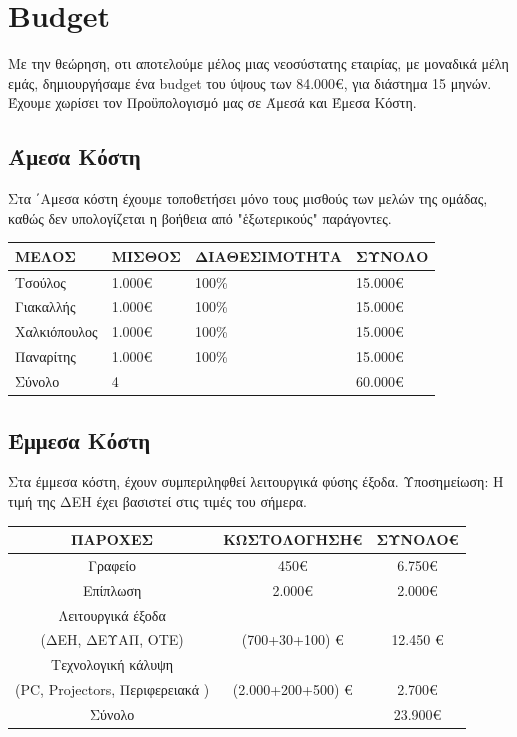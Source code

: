 \documentclass[11pt]{scrartcl} %
\begin{document}
\section{Budget}
Με την θεώρηση, οτι αποτελούμε μέλος μιας νεοσύστατης εταιρίας, με μοναδικά μέλη εμάς,
δημιουργήσαμε ένα budget του ύψους των 84.000€, για διάστημα 15 μηνών. Έχουμε χωρίσει τον Προϋπολογισμό μας σε Άμεσά και Έμεσα Κόστη.
\pagebreak

\subsection{Άμεσα Κόστη}
Στα ΄Αμεσα κόστη έχουμε τοποθετήσει μόνο τους μισθούς των μελών της ομάδας, καθώς δεν υπολογίζεται η βοήθεια από "ἑξωτερικούς" παράγοντες.

\begin{table}[!ht]
    \centering
    \begin{tabular}{|l|l|l|l|}
    \hline
        \textbf{ΜΕΛΟΣ} & \textbf{ΜΙΣΘΟΣ} & \textbf{ΔΙΑΘΕΣΙΜΟΤΗΤΑ} & \textbf{ΣΥΝΟΛΟ} \\ \hline
        Τσούλος & 1.000€ & 100\% & 15.000€ \\ \hline
        Γιακαλλής & 1.000€ & 100\% & 15.000€ \\ \hline
        Χαλκιόπουλος & 1.000€ & 100\% & 15.000€ \\ \hline
        Παναρίτης & 1.000€ & 100\% & 15.000€ \\ \hline
        Σύνολο & 4 & ~ & 60.000€ \\ \hline
    \end{tabular}
\end{table}

\subsection{Έμμεσα Κόστη}
Στα έμμεσα κόστη, έχουν συμπεριληφθεί λειτουργικά φύσης έξοδα. 
Υποσημείωση: Η τιμή της ΔΕΗ έχει βασιστεί στις τιμές του σήμερα.


\begin{table}[!ht]
    \centering
    \begin{tabular}{|c|c|c|}
    \hline
        \textbf{ΠΑΡΟΧΕΣ} & \textbf{ΚΩΣΤΟΛΟΓΗΣΗ€} & \textbf{ΣΥΝΟΛΟ€} \\ \hline
        Γραφείο & 450€ & 6.750€ \\ \hline
        Επίπλωση & 2.000€ & 2.000€ \\ \hline
        Λειτουργικά έξοδα &    ~           &   ~      \\ 
        (ΔΕΗ, ΔΕΥΑΠ, ΟΤΕ) & (700+30+100) € & 12.450 € \\ \hline
        Τεχνολογική κάλυψη & ~             & ~ \\
        (PC, Projectors, Περιφερειακά ) & (2.000+200+500) € & 2.700€ \\ \hline
        Σύνολο & ~ & 23.900€ \\ \hline
    \end{tabular}
\end{table}
\end{document}
